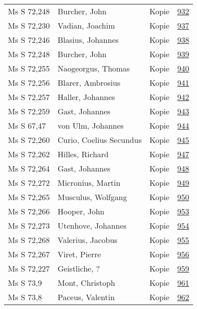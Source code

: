 \documentclass[10pt,a4paper,landscape]{report}
\begin{document}
\begin{longtable}{p{16cm}p{4cm}lr}
Ms S 72,248	&	Burcher, John	&	Kopie	&	\href{http://130.60.24.72/assignment/932}{932}\\
Ms S 72,230	&	Vadian, Joachim	&	Kopie	&	\href{http://130.60.24.72/assignment/937}{937}\\
Ms S 72,246	&	Blasius, Johannes	&	Kopie	&	\href{http://130.60.24.72/assignment/938}{938}\\
Ms S 72,248	&	Burcher, John	&	Kopie	&	\href{http://130.60.24.72/assignment/939}{939}\\
Ms S 72,255	&	Naogeorgus, Thomas	&	Kopie	&	\href{http://130.60.24.72/assignment/940}{940}\\
Ms S 72,256	&	Blarer, Ambrosius	&	Kopie	&	\href{http://130.60.24.72/assignment/941}{941}\\
Ms S 72,257	&	Haller, Johannes	&	Kopie	&	\href{http://130.60.24.72/assignment/942}{942}\\
Ms S 72,259	&	Gast, Johannes	&	Kopie	&	\href{http://130.60.24.72/assignment/943}{943}\\
Ms S 67,47	&	von Ulm, Johannes	&	Kopie	&	\href{http://130.60.24.72/assignment/944}{944}\\
Ms S 72,260	&	Curio, Coelius Secundus	&	Kopie	&	\href{http://130.60.24.72/assignment/945}{945}\\
Ms S 72,262	&	Hilles, Richard	&	Kopie	&	\href{http://130.60.24.72/assignment/947}{947}\\
Ms S 72,264	&	Gast, Johannes	&	Kopie	&	\href{http://130.60.24.72/assignment/948}{948}\\
Ms S 72,272	&	Micronius, Martin	&	Kopie	&	\href{http://130.60.24.72/assignment/949}{949}\\
Ms S 72,265	&	Musculus, Wolfgang	&	Kopie	&	\href{http://130.60.24.72/assignment/950}{950}\\
Ms S 72,266	&	Hooper, John	&	Kopie	&	\href{http://130.60.24.72/assignment/953}{953}\\
Ms S 72,273	&	Utenhove, Johannes	&	Kopie	&	\href{http://130.60.24.72/assignment/954}{954}\\
Ms S 72,268	&	Valerius, Jacobus	&	Kopie	&	\href{http://130.60.24.72/assignment/955}{955}\\
Ms S 72,267	&	Viret, Pierre	&	Kopie	&	\href{http://130.60.24.72/assignment/956}{956}\\
Ms S 72,227	&	Geistliche, ?	&	Kopie	&	\href{http://130.60.24.72/assignment/959}{959}\\
Ms S 73,9	&	Mont, Christoph	&	Kopie	&	\href{http://130.60.24.72/assignment/961}{961}\\
Ms S 73,8	&	Paceus, Valentin	&	Kopie	&	\href{http://130.60.24.72/assignment/962}{962}\\

\end{longtable}
\end{document}
